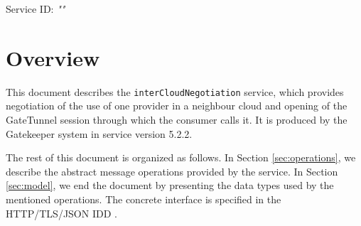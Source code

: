 \documentclass[a4paper]{arrowhead}
\begin{document}
\sloppy

\ArrowheadSetup

\begin{center}
  \vspace*{1cm}
  \huge{\arrowtitle}

  \vspace*{0.2cm}
  \LARGE{\arrowtype}
  \vspace*{1cm}

  \Large{Service ID: \textit{"\arrowid"}}

  \vspace*{\fill}


  \vspace*{1cm}
  \vspace*{\fill}

  \begin{abstract}
    This document describes the \texttt{inter\allowbreak{}Cloud\allowbreak{}Negotiation} service, version 5.2.2, produced by the Gatekeeper support system of Arrowhead 5.2.2.
  \end{abstract}

  \vspace*{1cm}
\end{center}

\newpage

\tableofcontents
\newpage

\section{Overview}
\label{sec:overview}

This document describes the \texttt{inter\allowbreak{}Cloud\allowbreak{}Negotiation} service, which provides negotiation of the use of one provider in a neighbour cloud and opening of the GateTunnel session through which the consumer calls it.
It is produced by the Gatekeeper system \cite{gk-sysd} in service version 5.2.2.

The rest of this document is organized as follows.
In Section \ref{sec:operations}, we describe the abstract message operations provided by the service.
In Section \ref{sec:model}, we end the document by presenting the data types used by the mentioned operations.
The concrete interface is specified in the HTTP/TLS/JSON IDD \cite{gk-interCloudNegotiation-http-idd}.
\end{document}
